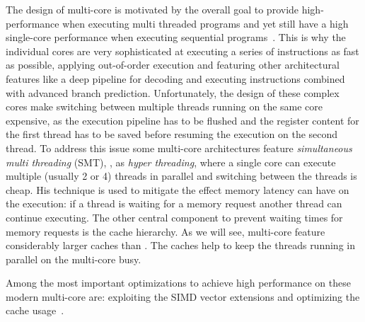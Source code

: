 The design of multi-core \CPUs is motivated by the overall goal to provide high-performance when executing multi threaded programs and yet still have a high single-core performance when executing sequential programs~\cite{GarlandK10}.
This is why the individual cores are very sophisticated at executing a series of instructions as fast as possible, applying out-of-order execution and featuring other architectural features like a deep pipeline for decoding and executing instructions combined with advanced branch prediction.
Unfortunately, the design of these complex cores make switching between multiple threads running on the same core expensive, as the execution pipeline has to be flushed and the register content for the first thread has to be saved before resuming the execution on the second thread.
To address this issue some multi-core architectures feature \emph{simultaneous multi threading} (SMT), \aka, as \emph{hyper threading}, where a single \CPU core can execute multiple (usually 2 or 4) threads in parallel and switching between the threads is cheap.
His technique is used to mitigate the effect memory latency can have on the execution:
if a thread is waiting for a memory request another thread can continue executing.
The other central component to prevent waiting times for memory requests is the cache hierarchy.
As we will see, multi-core \CPUs feature considerably larger caches than \GPUs.
The caches help to keep the threads running in parallel on the multi-core \CPU busy.

Among the most important optimizations to achieve high performance on these modern multi-core \CPUs are:
exploiting the SIMD vector extensions and optimizing the cache usage~\cite{IntelCPUOptimizingGuide}.

